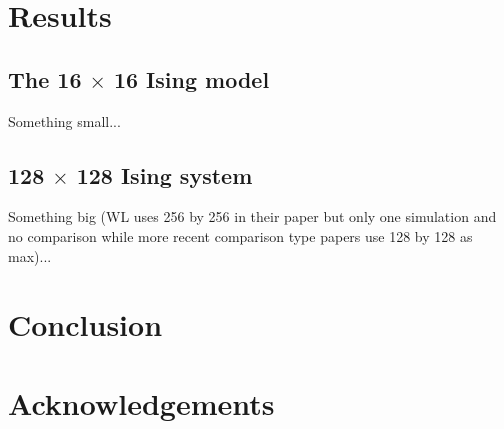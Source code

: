 \documentclass[letterpaper,twocolumn,amsmath,amssymb,pre,aps,10pt]{revtex4-1}
\begin{document}
\section{Results}

\subsection{The 16 $\times$ 16 Ising model}
Something small...
\subsection{128 $\times$ 128 Ising system}
Something big (WL uses 256 by 256 in their paper but only one simulation and
no comparison while more recent comparison type papers use 128 by 128 as max)...

\section{Conclusion}

\section{Acknowledgements}

\end{document}
